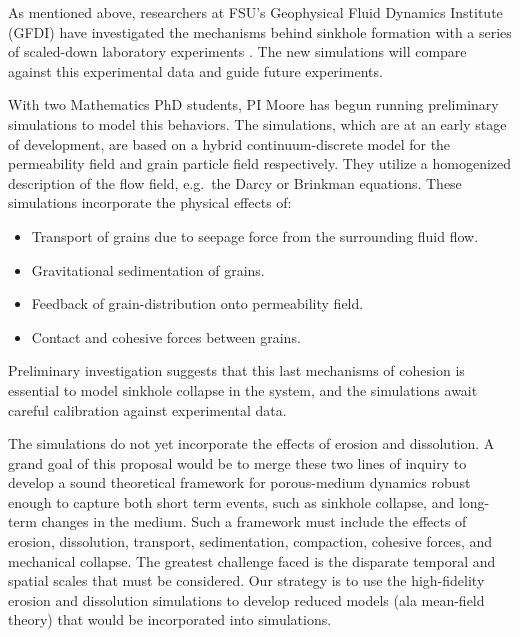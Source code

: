 \documentclass[11pt]{article}
\newcommand{\vsp}[1]{\vspace{#1 pc} \noindent}
\newcommand{\np}{\newpage \noindent}
\begin{document}
	As mentioned above, researchers at FSU's Geophysical Fluid Dynamics Institute (GFDI) have investigated the mechanisms behind sinkhole formation with a series of scaled-down laboratory experiments \cite{tao2014experimental}. The new simulations will compare against this experimental data and guide future experiments.


\vsp{3}

	With two Mathematics PhD students, PI Moore has begun running preliminary simulations to model this behaviors. The simulations, which are at an early stage of development, are based on a hybrid continuum-discrete model for the permeability field and grain particle field respectively. They utilize a homogenized description of the flow field, e.g.~the Darcy or Brinkman equations.
These simulations incorporate the physical effects of:
\begin{itemize}
\item Transport of grains due to seepage force from the surrounding fluid flow.
\item Gravitational sedimentation of grains.
\item Feedback of grain-distribution onto permeability field.
\item Contact and cohesive forces between grains.
\end{itemize}
Preliminary investigation suggests that this last mechanisms of cohesion is essential to model sinkhole collapse in the system, and the simulations await careful calibration against experimental data.

The simulations do not yet incorporate the effects of erosion and dissolution. A grand goal of this proposal would be to merge these two lines of inquiry to develop a sound theoretical framework for porous-medium dynamics robust enough to capture both short term events, such as sinkhole collapse, and long-term changes in the medium. Such a framework must include the effects of erosion, dissolution, transport, sedimentation, compaction, cohesive forces, and mechanical collapse. The greatest challenge faced is the disparate temporal and spatial scales that must be considered. Our strategy is to use the high-fidelity erosion and dissolution simulations to develop reduced models (ala mean-field theory) that would be incorporated into simulations.




\np
\end{document}
